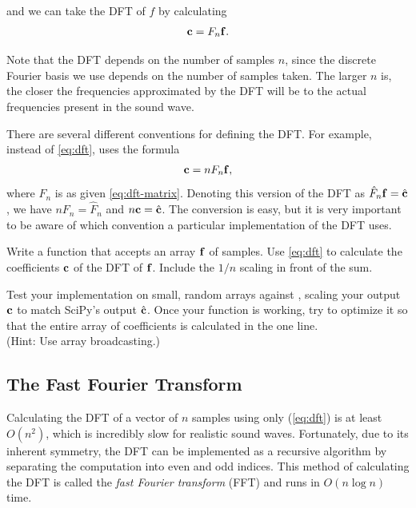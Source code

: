 and we can take the DFT of $f$ by calculating 
\begin{align}
\mathbf{c} = F_n \mathbf{f}.
\label{eq:dft}
\end{align}

Note that the DFT depends on the number of samples $n$, since the discrete Fourier basis we use depends on the number of samples taken.
The larger $n$ is, the closer the frequencies approximated by the DFT will be to the actual frequencies present in the sound wave.

\begin{warn}
There are several different conventions for defining the DFT.
For example, instead of \eqref{eq:dft},  uses the formula
\begin{align*}
\mathbf{c} = n F_n \mathbf{f},
\end{align*}
where $F_n$ is as given \eqref{eq:dft-matrix}.
Denoting this version of the DFT as $\hat{F}_n\mathbf{f} = \hat{\mathbf{c}}$, we have $nF_n = \hat{F}_n$ and $n\mathbf{c} = \hat{\mathbf{c}}$.
The conversion is easy, but it is very important to be aware of which convention a particular implementation of the DFT uses.
\end{warn}

\begin{problem} %
Write a function that accepts an array $\mathbf{f}$ of samples.
Use \ref{eq:dft} to calculate the coefficients $\mathbf{c}$ of the DFT of $\mathbf{f}$. Include the $1/n$ scaling in front of the sum.

Test your implementation on small, random arrays against , scaling your output $\mathbf{c}$ to match SciPy's output $\hat{\mathbf{c}}$. 
Once your function is working, try to optimize it so that the entire array of coefficients is calculated in the one line.
\\(Hint: Use array broadcasting.)
\label{prob:dft-naive}
\end{problem}

\subsection*{The Fast Fourier Transform} %

Calculating the DFT of a vector of $n$ samples using only (\ref{eq:dft}) is at least $O(n^2)$, which is incredibly slow for realistic sound waves.
Fortunately, due to its inherent symmetry, the DFT can be implemented as a recursive algorithm by separating the computation into even and odd indices.
This method of calculating the DFT is called the \emph{fast Fourier transform} (FFT) and runs in $O(n\log{n})$ time.

